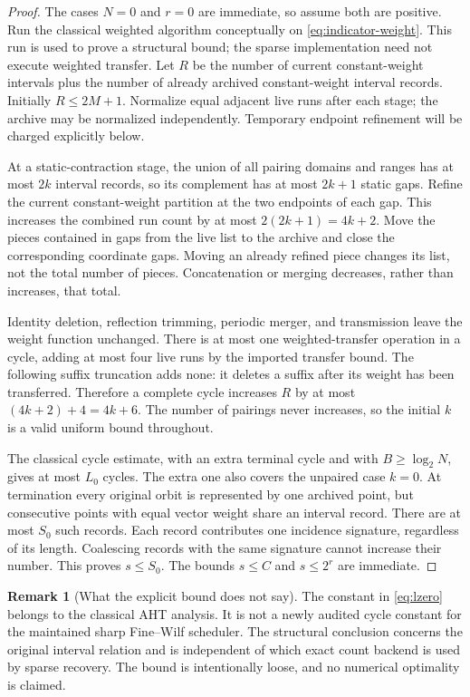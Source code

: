 \documentclass[11pt]{article}
\theoremstyle{definition}
\newtheorem{remark}[theorem]{Remark}
\begin{document}
\begin{proof}
The cases $N=0$ and $r=0$ are immediate, so assume both are positive.
Run the classical weighted algorithm conceptually on
\eqref{eq:indicator-weight}. This run is used to prove a structural bound;
the sparse implementation need not execute weighted transfer.
Let $R$ be the number of current constant-weight intervals plus the number
of already archived constant-weight interval records. Initially
$R\leq2M+1$. Normalize equal adjacent live runs after each stage; the archive may
be normalized independently. Temporary endpoint refinement will be charged
explicitly below.

At a static-contraction stage, the union of all pairing domains and ranges
has at most $2k$ interval records, so its complement has at most $2k+1$
static gaps. Refine the current constant-weight partition at the two
endpoints of each gap. This increases the combined run count by at most
$2(2k+1)=4k+2$. Move the pieces contained in gaps from the live list to the
archive and close the corresponding coordinate gaps. Moving an already
refined piece changes its list, not the total number of pieces. Concatenation
or merging decreases, rather than increases, that total.

Identity deletion, reflection trimming, periodic merger, and transmission
leave the weight function unchanged. There is at most one weighted-transfer
operation in a cycle, adding at most four live runs by the imported transfer
bound. The following suffix truncation adds none: it deletes a suffix after
its weight has been transferred. Therefore a complete cycle increases $R$
by at most $(4k+2)+4=4k+6$. The number of pairings never increases, so the
initial $k$ is a valid uniform bound throughout.

The classical cycle estimate, with an extra terminal cycle and with
$B\geq\log_2N$, gives at most $L_0$ cycles. The extra one also covers the
unpaired case $k=0$. At termination every original orbit is represented by
one archived point, but consecutive points with equal vector weight share
an interval record. There are at most $S_0$ such records. Each record
contributes one incidence signature, regardless of its length. Coalescing
records with the same signature cannot increase their number. This proves
$s\leq S_0$. The bounds $s\leq C$ and $s\leq2^r$ are immediate.
\end{proof}

\begin{remark}[What the explicit bound does not say]
The constant in \eqref{eq:lzero} belongs to the classical AHT analysis.
It is not a newly audited cycle constant for the maintained sharp
Fine--Wilf scheduler. The structural conclusion concerns the original
interval relation and is independent of which exact count backend is used
by sparse recovery. The bound is intentionally loose, and no numerical
optimality is claimed.
\end{remark}
\end{document}
